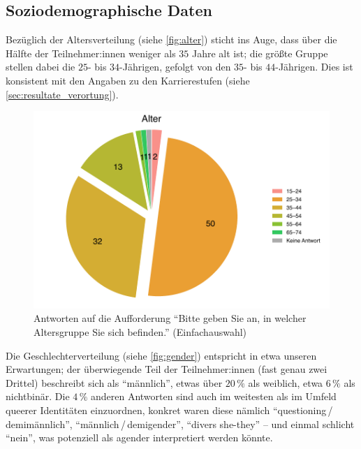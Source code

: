 \documentclass{scrartcl}
\begin{document}
\subsection{Soziodemographische Daten}\label{sec:resultate_soziodemographie}
Bezüglich der Altersverteilung (siehe \autoref{fig:alter}) sticht ins Auge, dass über die Hälfte der Teilnehmer:innen weniger als $35$ Jahre alt ist; die größte Gruppe stellen dabei die $25$- bis $34$-Jährigen, gefolgt von den $35$- bis $44$-Jährigen.
Dies ist konsistent mit den Angaben zu den Karrierestufen (siehe \autoref{sec:resultate_verortung}).

\begin{figure}[t]
   \includegraphics[width=1\textwidth]{alter.pdf}
   \caption{Antworten auf die Aufforderung \enquote{Bitte geben Sie an, in welcher Altersgruppe Sie sich befinden.} (Einfachauswahl)}
   \label{fig:alter}
\end{figure}

Die Geschlechterverteilung (siehe \autoref{fig:gender}) entspricht in etwa unseren Erwartungen; der überwiegende Teil der Teilnehmer:innen (fast genau zwei Drittel) beschreibt sich als \enquote{männlich}, etwas über $20\,\%$ als weiblich, etwa $6\,\%$ als nichtbinär.
Die $4\,\%$ anderen Antworten sind auch im weitesten als im Umfeld queerer Identitäten einzuordnen, konkret waren diese nämlich \enquote{questioning\,/\,demimännlich}, \enquote{männlich\,/\,demigender}, \enquote{divers she-they} -- und einmal schlicht \enquote{nein}, was potenziell als agender interpretiert werden könnte.
\end{document}
